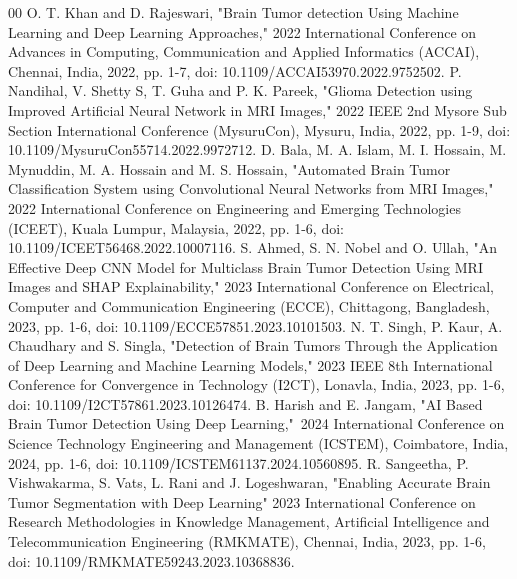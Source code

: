 \documentclass[conference]{IEEEtran}
\begin{document}

\begin{thebibliography}{00}
 O. T. Khan and D. Rajeswari, "Brain Tumor detection Using Machine Learning and Deep 
Learning Approaches," 2022 International Conference on Advances in Computing, Communication and Applied Informatics (ACCAI), Chennai, India, 2022, pp. 1-7, doi: 10.1109/ACCAI53970.2022.9752502.
 P. Nandihal, V. Shetty S, T. Guha and P. K. Pareek, "Glioma Detection using Improved Artificial Neural Network in MRI Images," 2022 IEEE 2nd Mysore Sub Section International Conference (MysuruCon), Mysuru, India, 2022, pp. 1-9, doi: 10.1109/MysuruCon55714.2022.9972712.
 D. Bala, M. A. Islam, M. I. Hossain, M. Mynuddin, M. A. Hossain and M. S. Hossain, "Automated Brain Tumor Classification System using Convolutional Neural Networks from MRI Images," 2022 International Conference on Engineering and Emerging Technologies (ICEET), Kuala Lumpur, Malaysia, 2022, pp. 1-6, doi: 10.1109/ICEET56468.2022.10007116.
S. Ahmed, S. N. Nobel and O. Ullah, "An Effective Deep CNN Model for Multiclass Brain Tumor Detection Using MRI Images and SHAP Explainability," 2023 International Conference on Electrical, Computer and Communication Engineering (ECCE), Chittagong, Bangladesh, 2023, pp. 1-6, doi: 10.1109/ECCE57851.2023.10101503.
N. T. Singh, P. Kaur, A. Chaudhary and S. Singla, "Detection of Brain Tumors Through the Application of Deep Learning and Machine Learning Models," 2023 IEEE 8th International Conference for Convergence in Technology (I2CT), Lonavla, India, 2023, pp. 1-6, doi: 10.1109/I2CT57861.2023.10126474.
B. Harish and E. Jangam, "AI Based Brain Tumor Detection Using Deep Learning," 2024 International Conference on Science Technology Engineering and Management (ICSTEM), Coimbatore, India, 2024, pp. 1-6, doi: 10.1109/ICSTEM61137.2024.10560895.
R. Sangeetha, P. Vishwakarma, S. Vats, L. Rani and J. Logeshwaran, "Enabling Accurate Brain Tumor Segmentation with Deep Learning" 2023 International Conference on Research Methodologies in Knowledge Management, Artificial Intelligence and Telecommunication Engineering (RMKMATE), Chennai, India, 2023, pp. 1-6, doi: 10.1109/RMKMATE59243.2023.10368836.

\end{thebibliography}
\end{document}
